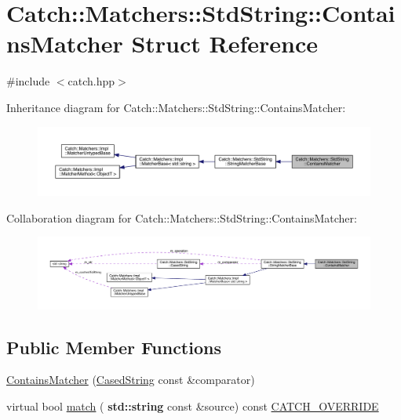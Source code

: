 \hypertarget{struct_catch_1_1_matchers_1_1_std_string_1_1_contains_matcher}{}\section{Catch\+:\+:Matchers\+:\+:Std\+String\+:\+:Contains\+Matcher Struct Reference}
\label{struct_catch_1_1_matchers_1_1_std_string_1_1_contains_matcher}


{\ttfamily \#include $<$catch.\+hpp$>$}



Inheritance diagram for Catch\+:\+:Matchers\+:\+:Std\+String\+:\+:Contains\+Matcher\+:
\nopagebreak
\begin{figure}[H]
\begin{center}
\leavevmode
\includegraphics[width=350pt]{struct_catch_1_1_matchers_1_1_std_string_1_1_contains_matcher__inherit__graph}
\end{center}
\end{figure}


Collaboration diagram for Catch\+:\+:Matchers\+:\+:Std\+String\+:\+:Contains\+Matcher\+:
\nopagebreak
\begin{figure}[H]
\begin{center}
\leavevmode
\includegraphics[width=350pt]{struct_catch_1_1_matchers_1_1_std_string_1_1_contains_matcher__coll__graph}
\end{center}
\end{figure}
\subsection*{Public Member Functions}
\begin{DoxyCompactItemize}
\item 
\hyperlink{struct_catch_1_1_matchers_1_1_std_string_1_1_contains_matcher_acc892883c8409e34b28c9b39d4ef1fe3}{Contains\+Matcher} (\hyperlink{struct_catch_1_1_matchers_1_1_std_string_1_1_cased_string}{Cased\+String} const \&comparator)
\item 
virtual bool \hyperlink{struct_catch_1_1_matchers_1_1_std_string_1_1_contains_matcher_ae4d567347fa563e365f1044f29ab1042}{match} (\textbf{ std\+::string} const \&source) const \hyperlink{catch_8hpp_a8ecdce4d3f57835f707915ae831eb847}{C\+A\+T\+C\+H\+\_\+\+O\+V\+E\+R\+R\+I\+DE}
\end{DoxyCompactItemize}
